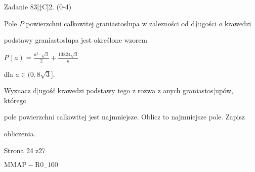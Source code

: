 \documentclass[a4paper,12pt]{article}
\begin{document}
Zadanie 83[‡C]2. (0-4)

Pole $P$ powierzchni calkowitej graniastoslupa w zalezności od d$\dagger$ugości $a$ krawedzi

podstawy graniastoslupa jest określone wzorem

$P(a)=\displaystyle \frac{a^{2}\cdot\sqrt{3}}{2}+\frac{13824\sqrt{3}}{a}$

dla $a\in(0,8\sqrt{3}].$

Wyznacz d[ugośč krawedzi podstawy tego z rozwa $\dot{\mathrm{z}}$ anych graniastos[upów, którego

pole powierzchni calkowitej jest najmniejsze. Oblicz to najmniejsze pole. Zapisz

obliczenia.

Strona 24 z27

$\mathrm{M}\mathrm{M}\mathrm{A}\mathrm{P}-\mathrm{R}0_{-}100$
\end{document}
